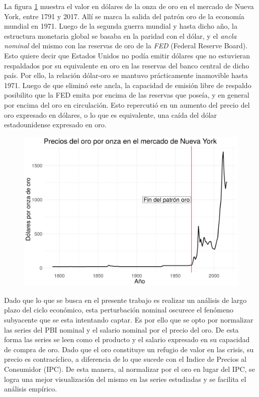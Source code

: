 \documentclass[a4paper]{article}
\begin{document}
La figura \ref{fig:oro} muestra el valor en dólares de la onza de oro en el mercado de Nueva York, entre 1791 y 2017. Allí se marca la salida del patrón oro de la economía mundial en 1971. Luego de la segunda guerra mundial y hasta dicho año, la estructura monetaria global se basaba en la paridad con el dólar, y el \textit{ancla nominal} del mismo con las reservas de oro de la \textit{FED} (Federal Reserve Board). Esto quiere decir que Estados Unidos no podía emitir dólares que no estuvieran respaldados por su equivalente en oro en las reservas del banco central de dicho país. Por ello, la relación dólar-oro se mantuvo prácticamente inamovible hasta 1971. Luego de que eliminó este ancla, la capacidad de emisión libre de respaldo posibilito que la FED emita por encima de las reservas que poseía, y en general por encima del oro en circulación. Esto repercutió en un aumento del precio del oro expresado en dólares, o lo que es equivalente, una caída del dólar estadounidense expresado en oro.

\begin{figure}[H]
	\centering
	\includegraphics[width=0.75\linewidth]{oro.png}
	 \caption{}\label{fig:oro}
\end{figure}

Dado que lo que se busca en el presente trabajo es realizar un análisis de largo plazo del ciclo económico, esta perturbación nominal oscurece el fenómeno subyacente que se esta intentando captar. Es por ello que se opto por normalizar las series del PBI nominal y el salario nominal por el precio del oro. De esta forma las series se leen como el producto y el salario expresado en su capacidad de compra de oro.
Dado que el oro constituye un refugio de valor en las crisis, su precio es contracíclico, a diferencia de lo que sucede con el Indice de Precios al Consumidor (IPC). De esta manera, al normalizar por el oro en lugar del IPC, se logra una mejor visualización del mismo en las series estudiadas y se facilita el análisis empírico.
\end{document}
